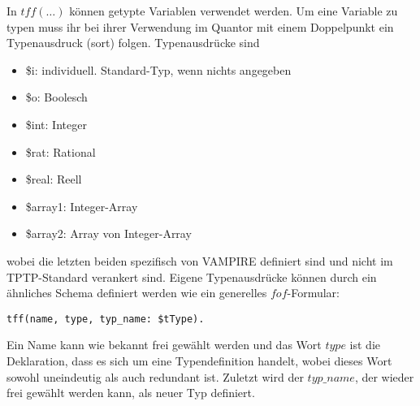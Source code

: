\documentclass{article}
\begin{document}
In $tff(\dots)$ können getypte Variablen verwendet werden. Um eine Variable zu typen muss ihr bei ihrer Verwendung im Quantor mit einem Doppelpunkt ein Typenausdruck (sort) folgen.
Typenausdrücke sind \begin{itemize}
	\item \$i: individuell. Standard-Typ, wenn nichts angegeben
	\item \$o: Boolesch
	\item \$int: Integer
	\item \$rat: Rational
	\item \$real: Reell
	\item \$array1: Integer-Array
	\item \$array2: Array von Integer-Array
\end{itemize}
wobei die letzten beiden spezifisch von VAMPIRE definiert sind und nicht im TPTP-Standard verankert sind.
Eigene Typenausdrücke können durch ein ähnliches Schema definiert werden wie ein generelles $fof$-Formular:
\begin{lstlisting}[language=tptp]
tff(name, type, typ_name: $tType).
\end{lstlisting}
Ein Name kann wie bekannt frei gewählt werden und das Wort $type$ ist die Deklaration, dass es sich um eine Typendefinition handelt, wobei dieses Wort sowohl uneindeutig als auch redundant ist.
Zuletzt wird der $typ\_name$, der wieder frei gewählt werden kann, als neuer Typ definiert.
\end{document}
